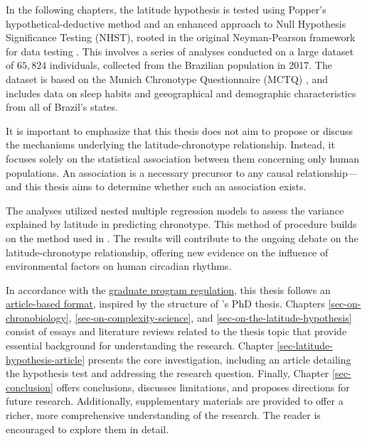 \documentclass[
12pt,
openright,
oneside,
a4paper,
chapter=TITLE,
section=TITLE,
french,
spanish,
brazil,
english
]{abntex2}
\begin{document}
In the following chapters, the latitude hypothesis is tested using
Popper's hypothetical-deductive method \autocite{popper1979a} and an
enhanced approach to Null Hypothesis Significance Testing (NHST), rooted
in the original Neyman-Pearson framework for data testing
\autocite{neyman1928,neyman1928a,perezgonzalez2015}. This involves a
series of analyses conducted on a large dataset of \(65,824\)
individuals, collected from the Brazilian population in 2017. The
dataset is based on the Munich Chronotype Questionnaire (MCTQ)
\autocite{roenneberg2003b,roenneberg2012a}, and includes data on sleep
habits and geeographical and demographic characteristics from all of
Brazil's states.

It is important to emphasize that this thesis does not aim to propose or
discuss the mechanisms underlying the latitude-chronotype relationship.
Instead, it focuses solely on the statistical association between them
concerning only human populations. An association is a necessary
precursor to any causal relationship---and this thesis aims to determine
whether such an association exists.

The analyses utilized nested multiple regression models to assess the
variance explained by latitude in predicting chronotype. This method of
procedure builds on the method used in \textcite{leocadio-miguel2017}.
The results will contribute to the ongoing debate on the
latitude-chronotype relationship, offering new evidence on the influence
of environmental factors on human circadian rhythms.

In accordance with the
\href{https://leginf.usp.br/?resolucao=resolucao-copgr-no-7829-de-03-de-outubro-de-2019\#:~:text=XI\%20\%E2\%80\%93\%20PROCEDIMENTOS\%20PARA\%20DEP\%C3\%93SITO\%20DA\%20DISSERTA\%C3\%87\%C3\%83O}{graduate
program regulation}, this thesis follows an
\href{https://en.wikipedia.org/wiki/Collection_of_articles}{article-based
format}, inspired by the structure of \textcite{reis2020b}'s PhD thesis.
Chapters \ref{sec-on-chronobiology}, \ref{sec-on-complexity-science},
and \ref{sec-on-the-latitude-hypothesis} consist of essays and
literature reviews related to the thesis topic that provide essential
background for understanding the research. Chapter
\ref{sec-latitude-hypothesis-article} presents the core investigation,
including an article detailing the hypothesis test and addressing the
research question. Finally, Chapter \ref{sec-conclusion} offers
conclusions, discusses limitations, and proposes directions for future
research. Additionally, supplementary materials are provided to offer a
richer, more comprehensive understanding of the research. The reader is
encouraged to explore them in detail.
\end{document}
